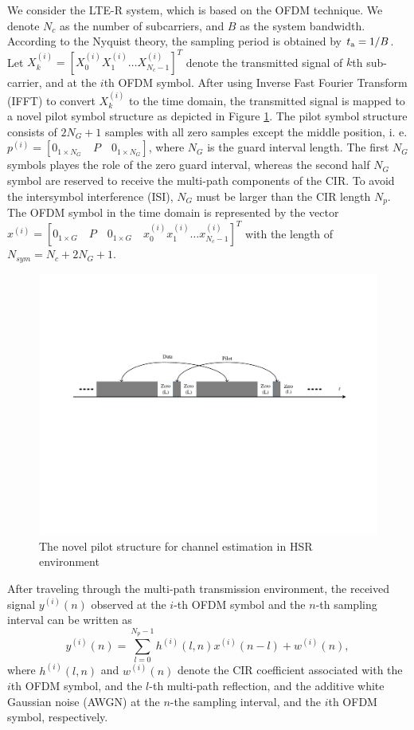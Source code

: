 \documentclass[12pt,journal,draftclsnofoot,onecolumn]{IEEEtran}
\begin{document}
We consider the LTE-R system, which is based on the OFDM technique. We denote $N_{c}$ as the number of subcarriers, and $B$ as the system bandwidth. According to the Nyquist theory, the sampling period is obtained by $t_{\rm a}=1/B$. Let $X^{(i)}_{k}= [X^{(i)}_{0} X^{(i)}_{1} \dots  X^{(i)}_{N_c-1}]^{T}$ denote the transmitted signal of $k$th sub-carrier, and at the $i$th OFDM symbol. After using Inverse Fast Fourier Transform (IFFT) to convert $X^{(i)}_{k}$ to the time domain, the transmitted signal is mapped to a novel pilot symbol structure as depicted in Figure \ref{fig:pilot-pattern}. The pilot symbol structure consists of  $2N_G+1$ samples with all zero samples except the middle position, i. e. $p^{(i)}=[0_{1\times N_G}\quad P\quad  0_{1\times N_G}]$, where $N_G$ is the guard interval length. The first  $N_G$ symbols playes the role of the zero guard interval, whereas the second half $N_G$ symbol are reserved to receive the multi-path components of the CIR. To avoid the intersymbol interference (ISI), $N_G$ must be larger than the CIR length $N_p$. The OFDM symbol in the time domain is represented by the  vector $x^{(i)}=[0_{1\times G}\quad P\quad  0_{1\times G}\quad  x^{(i)}_{0} x^{(i)}_{1} \dots x^{(i)}_{N_c-1}]^{T}$ with the length of $ N_{sym}=N_c+2N_G+1$.
%
\begin{figure}[t]
		\centering
		\includegraphics[width=0.9\linewidth]{"figures/pilot pattern"}
		\caption{The novel pilot structure for channel estimation in HSR environment }
		\label{fig:pilot-pattern}
\end{figure}
%	
	
After traveling through the multi-path transmission environment, the received signal $ y^{(i)}(n)$ observed at the $i$-th OFDM symbol and the $n$-th sampling interval can be written as
%
\begin{equation}\label{eq-time received signal} 
	y^{(i)}(n)= \sum_{l=0}^{{N_p}-1}h^{(i)}(l,n) x^{(i)}(n-l) + w^{(i)}(n),
\end{equation}
%
where $h^{(i)}(l,n)$  and  $w^{(i)}(n)$ denote the CIR coefficient associated with the $i$th OFDM symbol, and the $l$-th multi-path reflection, and  the additive white Gaussian noise (AWGN) at the  $n$-the sampling interval, and the $i$th OFDM symbol, respectively.
	
\end{document}
